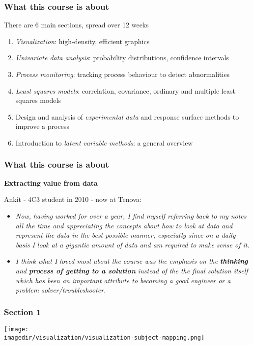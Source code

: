 \begin{frame}\frametitle{What this course is about}
	
	There are 6 main sections, spread over 12 weeks
	\begin{enumerate}
		\item	\emph{Visualization}: high-density, efficient graphics 
		\item	\emph{Univariate data analysis}: probability distributions, confidence intervals 
		\item	\emph{Process monitoring}: tracking process behaviour to detect abnormalities 
		\item	\emph{Least squares models}: correlation, covariance, ordinary and multiple least squares models 
		\item	Design and analysis of \emph{experimental data} and response surface methods to improve a process 
		\item	Introduction to \emph{latent variable methods}: a general overview 
	\end{enumerate}
\end{frame}

\begin{frame}\frametitle{What this course is about}
	
	\textbf{Extracting value from data}
	
	Ankit - 4C3 student in 2010 - now at Tenova:
	\begin{itemize}
		\item	\emph{Now, having worked for over a year, I find myself referring back to my notes all the time and appreciating the concepts about how to look at data and represent the data in the best possible manner, especially since on a daily basis I look at a gigantic amount of data and am required to make sense of it.} 
	\end{itemize}
	\begin{itemize}
		\item	\emph{I think what I loved most about the course was the emphasis on the} \textbf{\emph{thinking}} \emph{and} \textbf{\emph{process of getting to a solution}} \emph{instead of the the final solution itself which has been an important attribute to becoming a good engineer or a problem solver/troubleshooter.} 
	\end{itemize}
\end{frame}

\begin{frame}\frametitle{Section 1}
	
	\texttt{[image: \\imagedir/visualization/visualization-subject-mapping.png]}
\end{frame}

